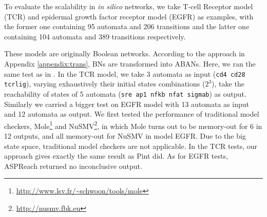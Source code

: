 To evaluate the scalability in \textit{in silico} networks, we take T-cell Receptor model (TCR) \cite{saez2007logical} and epidermal growth factor receptor model (EGFR) \cite{samaga2009logic} as examples, with the former one containing 95 automata and 206 transitions and the latter one containing 104 automata and 389 transitions respectively. 

These models are originally Boolean networks.
According to the approach in Appendix \ref{appendix:trans}, BNs are transformed into ABANs. 
Here, we ran the same test as in \cite{folschette2015}. In the TCR model, we take 3 automata as input (\texttt{cd4 cd28 tcrlig}), varying exhaustively their initial states combinations ($2^3$), take the reachability of states of 5 automata (\texttt{sre ap1 nfkb nfat sigmab}) as output. 
Similarly we carried a bigger test on EGFR model with 13 automata %
as input and 12 automata %
as output.
We first tested the performance of traditional model checkers, Mole\footnote{\url{http://www.lsv.fr/~schwoon/tools/mole}} and NuSMV\footnote{\url{http://nusmv.fbk.eu}}, in which Mole turns out to be memory-out for 6 in 12 outputs, and all memory-out for NuSMV in model EGFR. 
Due to the big state space, traditional model checkers are not applicable.
In the TCR tests, our approach gives exactly the same result as Pint did. 
As for EGFR tests, ASPReach returned no inconclusive output.

